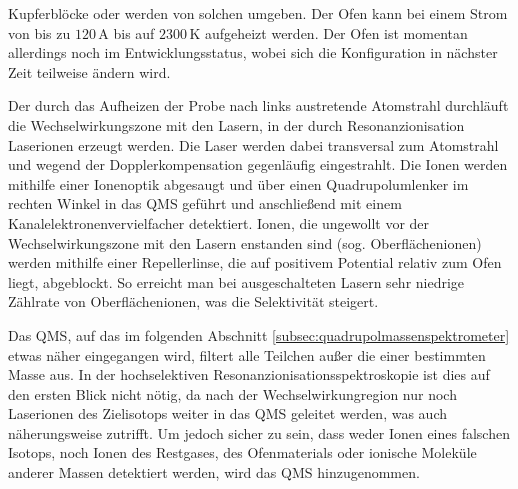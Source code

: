 Kupferblöcke oder werden von solchen umgeben. Der Ofen kann bei einem Strom von
bis zu $120\,$A bis auf $2300\,$K aufgeheizt werden. Der Ofen
ist momentan allerdings noch im Entwicklungsstatus, wobei sich die Konfiguration
in nächster Zeit teilweise ändern wird.\par
Der durch das Aufheizen der Probe nach links austretende Atomstrahl durchläuft
die Wechselwirkungszone mit den Lasern, in der durch Resonanzionisation
Laserionen erzeugt werden. Die Laser werden dabei transversal zum Atomstrahl
und wegend der Dopplerkompensation gegenläufig eingestrahlt. Die Ionen werden
mithilfe einer Ionenoptik abgesaugt und über einen Quadrupolumlenker im rechten Winkel in das QMS geführt und anschließend mit einem Kanalelektronenvervielfacher detektiert. Ionen, die ungewollt vor der
Wechselwirkungszone mit den Lasern enstanden sind (sog.
Oberflächenionen) werden mithilfe einer Repellerlinse, die auf positivem
Potential relativ zum Ofen liegt, abgeblockt.
So erreicht man bei ausgeschalteten Lasern sehr niedrige Zählrate von
Oberflächenionen, was die Selektivität steigert.\par
Das QMS, auf das im folgenden Abschnitt \ref{subsec:quadrupolmassenspektrometer}
etwas näher eingegangen wird, filtert alle Teilchen außer die einer bestimmten
Masse aus. In der hochselektiven Resonanzionisationsspektroskopie ist dies auf
den ersten Blick nicht nötig, da nach der Wechselwirkungregion nur noch
Laserionen des Zielisotops weiter in das QMS geleitet werden, was auch
näherungsweise zutrifft. Um jedoch sicher zu sein, dass weder Ionen eines
falschen Isotops, noch Ionen des Restgases, des Ofenmaterials oder ionische
Moleküle anderer Massen detektiert werden, wird das QMS hinzugenommen.

